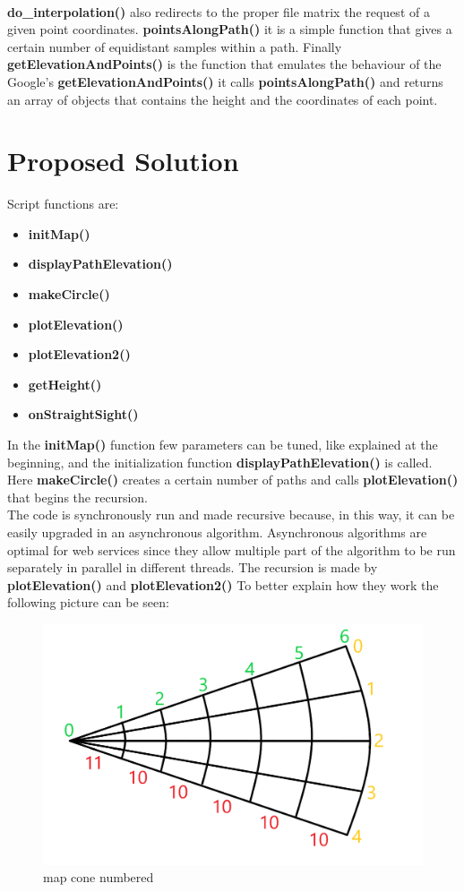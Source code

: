 \documentclass[peerreview]{IEEEtran}
\begin{document}
\\\textbf{do\_interpolation()} also redirects to the proper file matrix the request of a given point coordinates.
\textbf{pointsAlongPath()} it is a simple function that gives a certain number of equidistant samples within a path.
Finally \textbf{getElevationAndPoints()} is the function that emulates the behaviour of the Google’s \textbf{getElevationAndPoints()} it calls \textbf{pointsAlongPath()} and returns an array of objects that contains the height and the coordinates of each point.
\section{Proposed Solution}
Script functions are:
\begin{itemize}
\item \textbf{initMap()}
\item \textbf{displayPathElevation()}
\item \textbf{makeCircle()}
\item \textbf{plotElevation()}
\item \textbf{plotElevation2()}
\item \textbf{getHeight()}
\item \textbf{onStraightSight()}
\end{itemize}
In the \textbf{initMap()} function few parameters can be tuned, like explained at the beginning, and the initialization function \textbf{displayPathElevation()} is called. Here \textbf{makeCircle()} creates a certain number of paths and calls \textbf{plotElevation()} that begins the recursion.\\
The code is synchronously run and made recursive because, in this way, it can be easily upgraded in an asynchronous algorithm. Asynchronous algorithms are optimal for web services since they allow multiple part of the algorithm to be run separately in parallel in different threads.
The recursion is made by \textbf{plotElevation()} and \textbf{plotElevation2()} To better explain how they work the following picture can be seen:
\begin{figure}[!ht]
\centering
\includegraphics[width=1\columnwidth]{coneWithNumbers2} 
\caption{map cone numbered}
\label{fig_coneWithNumbers2}
\end{figure}
\end{document}
